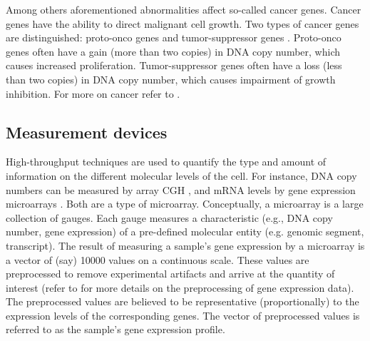 \documentclass[a4paper]{article}
\theoremstyle{myexamplestyle}
\begin{document}
Among others aforementioned abnormalities affect so-called cancer genes. Cancer genes have the ability to direct malignant cell growth. Two types of cancer genes are distinguished: proto-onco genes and tumor-suppressor genes \cite{Vog2004}. Proto-onco genes often have a gain (more than two copies) in DNA copy number, which causes increased proliferation. Tumor-suppressor genes often have a loss (less than two copies) in DNA copy number, which causes impairment of growth inhibition. For more on cancer refer to \cite{Wein2006}.


\subsection{Measurement devices}
High-throughput techniques are used to quantify the type and amount of information on the different molecular levels of the cell. For instance, DNA copy numbers can be measured by array CGH \cite{Pin2005}, and mRNA levels by gene expression microarrays \cite{Ngu2002}. Both are a type of microarray. Conceptually, a microarray is a large collection of gauges. Each gauge measures a characteristic (e.g., DNA copy number, gene expression) of a pre-defined molecular entity (e.g. genomic segment, transcript). The result of measuring a sample's gene expression by a microarray is a vector of (say) 10000 values on a continuous scale. These values are preprocessed to remove experimental artifacts and arrive at the quantity of interest (refer to \cite{Ngu2002} for more details on the preprocessing of gene expression data). The preprocessed values are believed to be representative (proportionally) to the expression levels of the corresponding genes. The vector of preprocessed values is referred to as the sample's gene expression profile.
\end{document}
